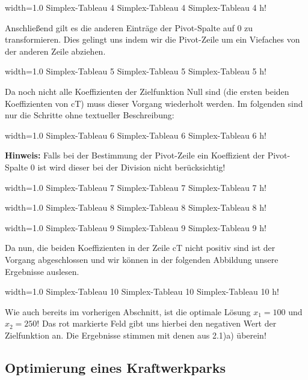 \documentclass{eegreport}
\begin{document}
       {width=1.0\textwidth}
       {Simplex-Tableau 4}
       {Simplex-Tableau 4}
       {Simplex-Tableau 4}
       {h!}    
       
Anschließend gilt es die anderen Einträge der Pivot-Spalte auf 0 zu transformieren. Dies gelingt uns indem wir die Pivot-Zeile um ein Viefaches von der anderen Zeile abziehen.

       {width=1.0\textwidth}
       {Simplex-Tableau 5}
       {Simplex-Tableau 5}
       {Simplex-Tableau 5}
       {h!}     
       
Da noch nicht alle Koeffizienten der Zielfunktion Null sind (die ersten beiden Koeffizienten von cT) muss dieser Vorgang wiederholt werden. Im folgenden sind nur die Schritte ohne textueller Beschreibung:

       {width=1.0\textwidth}
       {Simplex-Tableau 6}
       {Simplex-Tableau 6}
       {Simplex-Tableau 6}
       {h!} 
       
\textbf{Hinweis:} Falls bei der Bestimmung der Pivot-Zeile ein Koeffizient der Pivot-Spalte 0 ist wird dieser bei der Division nicht berücksichtig!       
    
       {width=1.0\textwidth}
       {Simplex-Tableau 7}
       {Simplex-Tableau 7}
       {Simplex-Tableau 7}
       {h!}        
 
       {width=1.0\textwidth}
       {Simplex-Tableau 8}
       {Simplex-Tableau 8}
       {Simplex-Tableau 8}
       {h!}             

       {width=1.0\textwidth}
       {Simplex-Tableau 9}
       {Simplex-Tableau 9}
       {Simplex-Tableau 9}
       {h!} 

\newpage       
Da nun, die beiden Koeffizienten in der Zeile cT nicht positiv sind ist der Vorgang abgeschlossen und wir können in der folgenden Abbildung unsere Ergebnisse auslesen.       

       {width=1.0\textwidth}
       {Simplex-Tableau 10}
       {Simplex-Tableau 10}
       {Simplex-Tableau 10}
       {h!} 
       
Wie auch bereits im vorherigen Abschnitt, ist die optimale Lösung $x_1 = 100$ und $x_2 = 250$! Das rot markierte Feld gibt uns hierbei den negativen Wert der Zielfunktion an. Die Ergebnisse stimmen mit denen aus 2.1)a) überein!       

\newpage
\subsection{Optimierung eines Kraftwerkparks}
\end{document}
